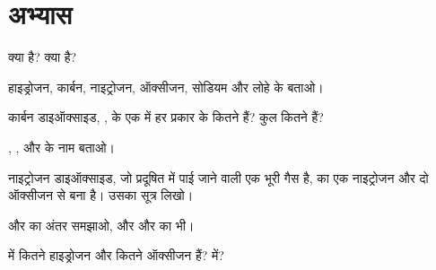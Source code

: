 \section{अभ्यास}

\begin{exercise}[$\star$]\label{exo:g7:atoms-and-molecules:1}
 क्या है?  क्या है?
\end{exercise}

\begin{exercise}[$\star$]\label{exo:g7:atoms-and-molecules:2}
हाइड्रोजन, कार्बन, नाइट्रोजन, ऑक्सीजन, सोडियम और लोहे के 
बताओ।
\end{exercise}

\begin{exercise}[$\star$]\label{exo:g7:atoms-and-molecules:3}
कार्बन डाइऑक्साइड, , के एक  में हर प्रकार के कितने 
हैं? कुल कितने  हैं?
\end{exercise}

\begin{exercise}[$\star$]\label{exo:g7:atoms-and-molecules:4}
 , ,  और  के नाम बताओ।
\end{exercise}

\begin{exercise}[$\star$]\label{exo:g7:atoms-and-molecules:5}
नाइट्रोजन डाइऑक्साइड, जो प्रदूषित  में पाई जाने वाली एक भूरी गैस है, का 
एक नाइट्रोजन  और दो ऑक्सीजन  से बना है। उसका सूत्र लिखो।
\end{exercise}

\begin{exercise}[$\star\star$]\label{exo:g7:atoms-and-molecules:6}
 और  का अंतर समझाओ, और 
और  का भी।
\end{exercise}

\begin{exercise}[$\star\star$]\label{exo:g7:atoms-and-molecules:7}
 में कितने हाइड्रोजन  और कितने ऑक्सीजन  हैं?
 में?
\end{exercise}

